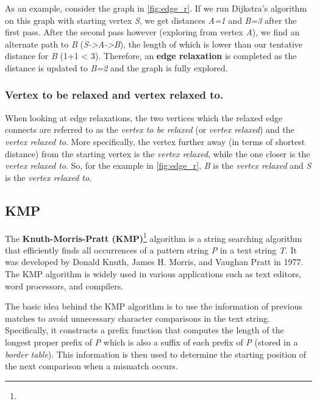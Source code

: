 \documentclass{l4proj}
\begin{document}

As an example, consider the graph in \autoref{fig:edge_r}. If we run Dijkstra's algorithm on this graph with starting vertex \emph{S}, we get distances \emph{A=1} and \emph{B=3} after the first pass. After the second pass however (exploring from vertex \emph{A}), we find an alternate path to \emph{B} (\emph{S->A->B}), the length of which is lower than our tentative distance for \emph{B} (1+1 < 3). Therefore, an \textbf{edge relaxation} is completed as the distance is updated to \emph{B=2} and the graph is fully explored.

\subsubsection{Vertex to be relaxed and vertex relaxed to.}

When looking at edge relaxations, the two vertices which the relaxed edge connects are referred to as the \emph{vertex to be relaxed} (or \emph{vertex relaxed}) and the \emph{vertex relaxed to}. More specifically, the vertex further away (in terms of shortest distance) from the starting vertex is the \emph{vertex relaxed}, while the one closer is the \emph{vertex relaxed to}. So, for the example in \autoref{fig:edge_r}, \emph{B} is the \emph{vertex relaxed} and \emph{S} is the \emph{vertex relaxed to}.

\subsection{KMP}

The \textbf{Knuth-Morris-Pratt (KMP)}\footnote{} algorithm is a string searching algorithm that efficiently finds all occurrences of a pattern string \emph{P} in a text string \emph{T}. It was developed by Donald Knuth, James H. Morris, and Vaughan Pratt in 1977. The KMP algorithm is widely used in various applications such as text editors, word processors, and compilers.

The basic idea behind the KMP algorithm is to use the information of previous matches to avoid unnecessary character comparisons in the text string. Specifically, it constructs a prefix function that computes the length of the longest proper prefix of \emph{P} which is also a suffix of each prefix of \emph{P} (stored in a \emph{border table}). This information is then used to determine the starting position of the next comparison when a mismatch occurs.
\end{document}
